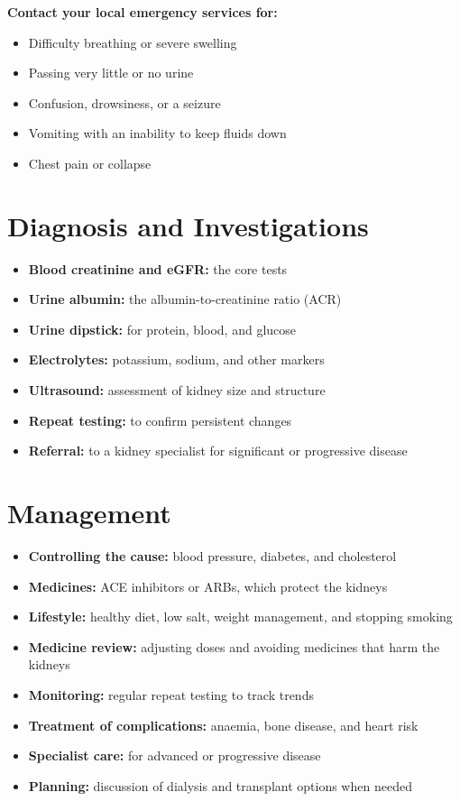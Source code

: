 \textbf{Contact your local emergency services for:}
\begin{itemize}
    \item Difficulty breathing or severe swelling
    \item Passing very little or no urine
    \item Confusion, drowsiness, or a seizure
    \item Vomiting with an inability to keep fluids down
    \item Chest pain or collapse
\end{itemize}

\section*{Diagnosis and Investigations}
\begin{itemize}
    \item \textbf{Blood creatinine and eGFR:} the core tests
    \item \textbf{Urine albumin:} the albumin-to-creatinine ratio (ACR)
    \item \textbf{Urine dipstick:} for protein, blood, and glucose
    \item \textbf{Electrolytes:} potassium, sodium, and other markers
    \item \textbf{Ultrasound:} assessment of kidney size and structure
    \item \textbf{Repeat testing:} to confirm persistent changes
    \item \textbf{Referral:} to a kidney specialist for significant or progressive disease
\end{itemize}

\section*{Management}
\begin{itemize}
    \item \textbf{Controlling the cause:} blood pressure, diabetes, and cholesterol
    \item \textbf{Medicines:} ACE inhibitors or ARBs, which protect the kidneys
    \item \textbf{Lifestyle:} healthy diet, low salt, weight management, and stopping smoking
    \item \textbf{Medicine review:} adjusting doses and avoiding medicines that harm the kidneys
    \item \textbf{Monitoring:} regular repeat testing to track trends
    \item \textbf{Treatment of complications:} anaemia, bone disease, and heart risk
    \item \textbf{Specialist care:} for advanced or progressive disease
    \item \textbf{Planning:} discussion of dialysis and transplant options when needed
\end{itemize}

